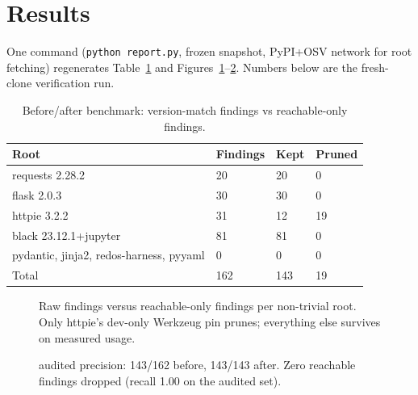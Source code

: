 \documentclass[11pt,a4paper]{article}
\begin{document}
\section{Results}
\label{sec:results}

One command (\verb!python report.py!, frozen snapshot, PyPI+OSV network for root fetching) regenerates Table~\ref{tab:results} and Figures~\ref{fig:bars}--\ref{fig:prec}. Numbers below are the fresh-clone verification run.

\begin{table}[H]
\centering
\caption{Before/after benchmark: version-match findings vs reachable-only findings.}
\label{tab:results}
\begin{tabular}{@{}llll@{}}
\toprule
Root & Findings & Kept & Pruned \\
\midrule
requests 2.28.2 & 20 & 20 & 0 \\
flask 2.0.3 & 30 & 30 & 0 \\
httpie 3.2.2 & 31 & 12 & 19 \\
black 23.12.1+jupyter & 81 & 81 & 0 \\
pydantic, jinja2, redos-harness, pyyaml & 0 & 0 & 0 \\
\midrule
Total & 162 & 143 & 19 \\
\bottomrule
\end{tabular}
\end{table}

\begin{figure}[H]
\centering
{}
\caption{Raw findings versus reachable-only findings per non-trivial root. Only httpie's dev-only Werkzeug pin prunes; everything else survives on measured usage.}
\label{fig:bars}
\end{figure}

\begin{figure}[H]
\centering
{}
\caption{ audited precision: 143/162 before, 143/143 after. Zero reachable findings dropped (recall 1.00 on the audited set).}
\label{fig:prec}
\end{figure}
\end{document}

